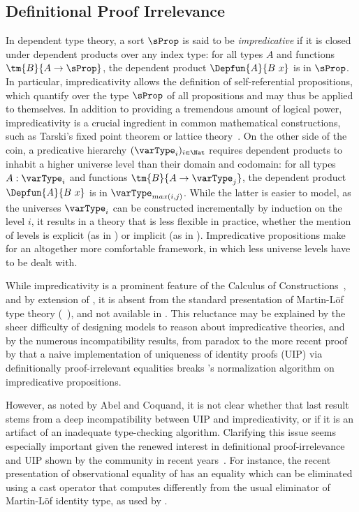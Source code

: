 \subsection{Definitional Proof Irrelevance}

In dependent type theory, a sort \( \sProp \) is said to be
\emph{impredicative} if it is closed under dependent products over any index
type: for all types \( A \) and functions \( \tm{B}{A \to \sProp} \),
the dependent product \( \Depfun{A}{B\ x} \) is in \( \sProp \).
%
In particular, impredicativity allows the definition of self-referential propositions,
which quantify over the type \( \sProp \) of all propositions and may thus
be applied to themselves.
%
In addition to providing a tremendous amount of logical power, impredicativity is
a crucial ingredient in common mathematical constructions, such as
Tarski's fixed point theorem or lattice theory~.
%
On the other side of the coin, a predicative hierarchy $(\varType_i)_{i \in \Nat}$
requires dependent products to inhabit a higher universe level
than their domain and codomain: for all types \( A : \varType_i \) and functions
\( \tm{B}{A \to \varType_j} \), the dependent product
\( \Depfun{A}{B\ x} \) is in \( \varType_{max(i,j)} \).
%
While the latter is easier to model, as the universes $\varType_i$ can be
constructed incrementally by induction on the level $i$, it results
in a theory that is less flexible in practice, whether the mention of
levels is explicit (as in \Agda) or implicit (as in \Coq).
%
Impredicative propositions make for an altogether
more comfortable framework, in which less universe levels have to
be dealt with.

While impredicativity is a prominent feature of the Calculus of
Constructions~, and by extension of \Coq, it is
absent from the standard presentation of Martin-Löf type theory
(\MLTT~), and not available in \Agda.
%
This reluctance may be explained by the sheer difficulty of designing models
to reason about impredicative theories, and by the numerous incompatibility
results, from  paradox to the more recent proof by
 that a naive implementation of uniqueness of identity
proofs (UIP) via definitionally proof-irrelevant equalities breaks \Coq's
normalization algorithm on impredicative propositions.

However, as noted by Abel and Coquand, it is not clear whether that last
result stems from a deep incompatibility between UIP and impredicativity,
or if it is an artifact of an inadequate type-checking algorithm.
%
Clarifying this issue seems especially important given the renewed
interest in definitional proof-irrelevance and UIP shown by the community
in recent years~.
%
For instance, the recent presentation \SetoidTT of observational
equality of  has an equality which can be
eliminated using a cast operator that computes differently from the
usual eliminator of Martin-Löf identity type, as used by .


